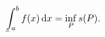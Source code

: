 \newcommand\lowint{%
  \mspace{2mu}\underline{\vphantom{\int}\mspace{7mu}}\mspace{-9mu}\int}
\[
  \lowint_a^b f(x)\,\mathrm{d}x = \inf_P s(P).
\]
